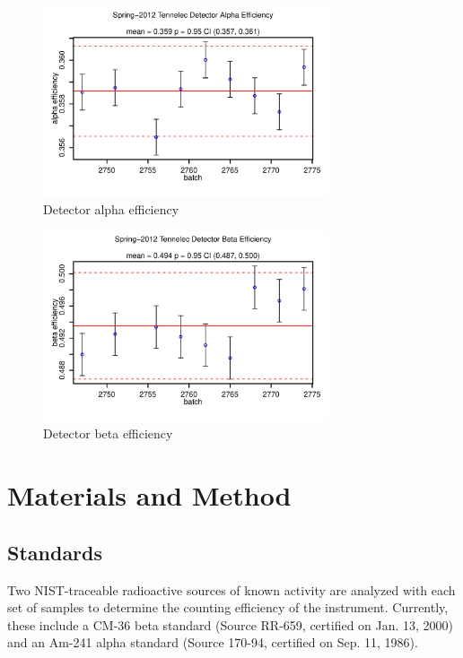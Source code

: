 \documentclass[letterpaper,12pt]{article}
\begin{document}
\begin{figure}[h!]
\begin{center}
\includegraphics[width=0.75\textwidth]{./figs/Spring-2012-alpha-efficiency.pdf}
\end{center}
\caption{Detector alpha efficiency}
\label{ana:Am}
\end{figure}

\begin{figure}[h!]
\begin{center}
\includegraphics[width=0.75\textwidth]{./figs/Spring-2012-beta-efficiency.pdf}
\end{center}
\caption{Detector beta efficiency}
\label{ana:Cl}
\end{figure}


\section*{Materials and Method}

\subsection*{Standards}
Two NIST-traceable radioactive sources of known activity are analyzed
with each set of samples to determine the counting efficiency of the
instrument. Currently, these include a CM-36 beta standard
(Source RR-659, certified on Jan. 13, 2000) and an Am-241 alpha standard
(Source 170-94, certified on Sep. 11, 1986).
\end{document}
